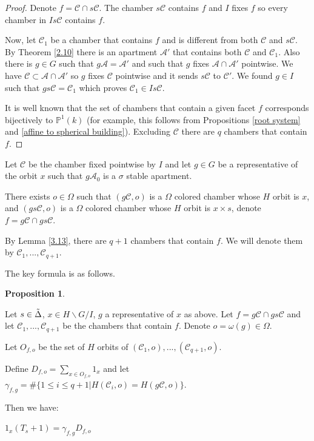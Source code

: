\documentclass[12pt]{article}
\newcommand{\p}{\mathbb{P}}
\newcommand{\A}{\mathcal{A}}
\newcommand{\C}{\mathcal{C}}
\newcommand{\<}{\langle}
\renewcommand{\>}{\rangle}
\theoremstyle{plain}
\theoremstyle{definition}
\newtheorem{prop}[theorem]{Proposition}
\begin{document}
\begin{proof}
Denote $f=\C \cap s\C$. The chamber $s\C$ contains $f$ and $I$ fixes $f$ so every chamber in $Is\C$ contains $f$.

Now, let $\C_1$ be a chamber that contains $f$ and is different from both $\C$ and $s\C$. By Theorem \ref{2.10} there is an apartment $\A'$ that contains both $\C$ and $\C_1$. Also there is $g\in G$ such that $g\A=\A'$ and such that $g$ fixes $\A\cap \A'$ pointwise. We have $\C\subset \A\cap\A'$ so $g$ fixes $\C$ pointwise and it sends $s\C$ to $\C'$. We found $g\in I$ such that $gs\C=\C_1$ which proves $\C_1\in Is\C$.

It is well known that the set of chambers that contain a given facet $f$ corresponds bijectively to $\p^1(k)$ (for example, this follows from Propositions \ref{root system} and \ref{affine to spherical building}). Excluding $\C$ there are $q$ chambers that contain $f$.

\end{proof}



Let $\C$ be the chamber fixed pointwise by $I$ and let $g\in G$ be a representative of the orbit $x$ such that $g\A_0$ is a $\sigma$ stable apartment. 

There exists $o\in \Omega$ such that $(g\C,o)$ is a $\Omega$ colored chamber whose $H$ orbit is $x$, and $(gs\C,o)$ is a $\Omega$ colored chamber whose $H$ orbit is $x\times s$, denote $f=g\C\cap gs\C$.


By Lemma \ref{3.13}, there are $q+1$ chambers that contain $f$. We will denote them by $\C_1,...,\C_{q+1}$.

The key formula is as follows.

\begin{prop}\label{key_computation}

Let $s\in \Tilde{\Delta}$, $x\in H\backslash G/I$, $g$ a representative of $x$ as above. Let $f=g\C\cap gs\C$ and let $\C_1,...,\C_{q+1}$ be the chambers that contain $f$. Denote $o=\omega(g)\in\Omega$.

Let $O_{f,o}$ be the set of $H$ orbits of $(\C_1,o),...,(\C_{q+1},o)$.

Define $D_{f,o}=\sum_{x\in O_{f,o}}1_x$ and 
let $\gamma_{f,g}=\#\{1\leq i\leq q+1|H(\C_i,o)=H(g\C,o)\}$.

Then we have:
\begin{center}
    $1_x(T_s+1)=\gamma_{f,g} D_{f,o}$
\end{center}
\end{prop}
\end{document}
